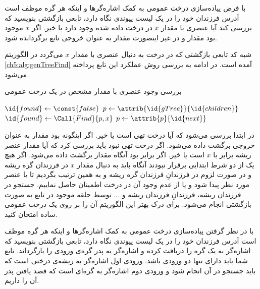 
 با فرض پیاده‌سازی درخت عمومی به کمک اشاره‌گرها و اینکه هر گره موظف است آدرس فرزندان خود را در یک لیست پیوندی نگاه دارد، تابعی بازگشتی بنویسید که بررسی کند آیا عنصری با مقدار {$x$} در درخت داده شده وجود دارد یا خیر. اگر {$x$} موجود بود مقدار {} و در غیر اینصورت مقدار {} به عنوان خروجی تابع برگردانده شود.


شبه کد تابعی بازگشتی که در درخت {} به دنبال عنصری با مقدار {$x$} می‌گردد در الگوریتم {\eqref{ch5:alg:genTreeFind}} آمده است. در ادامه به بررسی روش عملکرد این تابع پرداخته می‌شود.
\begin{algorithm}[H]
\caption{بررسی وجود عنصری با مقدار مشخص در یک درخت عمومی}\label{ch5:alg:genTreeFind}
\begin{latin}
\begin{algorithmic}[1]
				\State	\Return
		\EndIf
				\State	\Return {}
		\EndIf
		\State	$\id{found} \gets \const{false}$
		\State	$p \gets \attrib{\id{gTree}}{\id{children}}$
				\State	$\id{found} \gets \Call{Find}{p,x}$
				\State	$p \gets \attrib{p}{\id{next}}$
		\EndWhile
		\State	\Return {}
\EndFunction
\end{algorithmic}
\end{latin}
\end{algorithm}

در ابتدا بررسی می‌شود که آیا درخت تهی است یا خیر. اگر اینگونه بود مقدار {} به عنوان خروجی برگشت داده می‌شود. اگر درخت تهی نبود باید بررسی کرد که آیا مقدار عنصر ریشه برابر با {$x$} است یا خیر. اگر برابر بود آنگاه مقدار {} برگشت داده می‌شود. اگر هیچ یک از دو شرط ابتدایی برقرار نبودند آنگاه باید به دنبال مقدار {$x$} در فرزندان گره ریشه و در صورت لزوم در فرزندانِ فرزندان گره ریشه و به همین ترتیب بگردیم تا یا عنصر مورد نظر پیدا شود و یا از عدم وجود آن در درخت اطمینان حاصل نماییم. جستجو در فرزندان ریشه، فرزندانِ فرزندان ریشه و ... توسط حلقه موجود در تابع به صورت بازگشتی انجام می‌شود. برای درک بهتر این الگوریتم آن را بر روی یک درخت عمومی ساده امتحان کنید.

 با در نظر گرفتن پیاده‌سازی درخت عمومی به کمک اشاره‌گرها و اینکه هر گره موظف است آدرس فرزندان خود را در یک لیست پیوندی نگاه دارد، تابعی بازگشتی بنویسید که اشاره‌گر به یک گره را دریافت کرده و اشاره‌گر به پدر گره‌ی ورودی را بازگرداند. تابع شما باید دارای تنها دو ورودی باشد. ورودی اول اشاره‌گر به ریشه‌ی درختی است که باید جستجو در آن انجام شود و ورودی دوم اشاره‌گر به گره‌ای است که قصد یافتن پدر آن را داریم.

